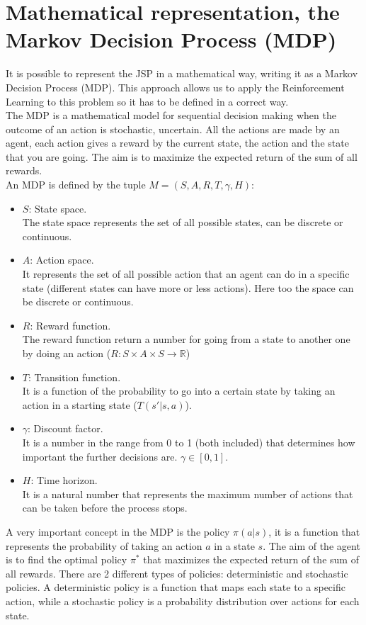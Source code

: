 \documentclass[12pt]{book}
\begin{document}
\section{Mathematical representation, the Markov Decision Process (MDP)}
It is possible to represent the JSP in a mathematical way, writing it as a Markov Decision Process (MDP)\cite{sutton2018reinforcement}. This approach allows us to apply the Reinforcement Learning to this problem so it has to be defined in a correct way.\\
The MDP is a mathematical model for sequential decision making when the outcome of an action is stochastic, uncertain. All the actions are made by an agent, each action gives a reward by the current state, the action and the state that you are going. The aim is to maximize the expected return of the sum of all rewards.\\
An MDP is defined by the tuple $M=(S, A, R, T, \gamma, H)$:
\begin{itemize}
    \item $S$: State space.\\
    The state space represents the set of all possible states, can be discrete or continuous.
    \item $A$: Action space.\\
    It represents the set of all possible action that an agent can do in a specific state (different states can have more or less actions). Here too the space can be discrete or continuous.
    \item $R$: Reward function.\\
    The reward function return a number for going from a state to another one by doing an action ($R: S\times A\times S\rightarrow\mathbb{R}$)
    \item $T$: Transition function.\\
    It is a function of the probability to go into a certain state by taking an action in a starting state ($T(s'|s,a)$).
    \item $\gamma$: Discount factor.\\
    It is a number in the range from 0 to 1 (both included) that determines how important the further decisions are. $\gamma\in [0,1]$.
    \item $H$: Time horizon.\\
    It is a natural number that represents the maximum number of actions that can be taken before the process stops.
\end{itemize}

A very important concept in the MDP is the policy $\pi(a|s)$, it is a function that represents the probability of taking an action $a$ in a state $s$. The aim of the agent is to find the optimal policy $\pi^*$ that maximizes the expected return of the sum of all rewards. There are 2 different types of policies: deterministic and stochastic policies. A deterministic policy is a function that maps each state to a specific action, while a stochastic policy is a probability distribution over actions for each state.\\
\end{document}
